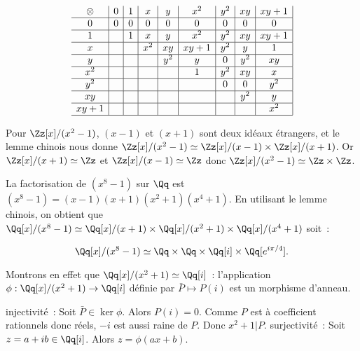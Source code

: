 {\begin{enumerate}
{$$
\begin{array}{c|c|c|c|c|c|c|c|c|c|c|}
\otimes   &   0 &   1 &   x &   y & x^2  & y^2  & xy   & xy+1\\\hline
0         &   0 &   0 &   0 &   0 & 0    & 0    & 0    & 0   \\\hline
1         &     &   1 &   x &   y & x^2  & y^2  & xy   & xy+1\\\hline
x         &     &     & x^2 &  xy & xy+1 & y^2  & y    & 1   \\\hline
y         &     &     &     & y^2 &  y   & 0    & y^2  & xy  \\\hline
x^2       &     &     &     &     &  1   & y^2  & xy   & x   \\\hline
y^2       &     &     &     &     &      & 0    & 0    & y^2 \\\hline
xy        &     &     &     &     &      &      & y^2  & y   \\\hline
xy+1      &     &     &     &     &      &      &      & x^2 \\\hline
\end{array}
$$
 
Pour $\Zz[x]/(x^{2}-1)$, $(x-1)$ et $(x+1)$ sont deux idéaux étrangers,
et le lemme chinois nous donne $\Zz[x]/(x^{2}-1)\simeq
\Zz[x]/(x-1)\times\Zz[x]/(x+1)$. Or $\Zz[x]/(x+1)\simeq\Zz$ et
$\Zz[x]/(x-1)\simeq\Zz$ donc $\Zz[x]/(x^{2}-1)\simeq\Zz\times\Zz$.


La factorisation de $(x^{8}-1)$ sur $\Qq$ est
$(x^{8}-1)=(x-1)(x+1)(x^{2}+1)(x^{4}+1)$. En utilisant le lemme chinois,
on obtient que $\Qq[x]/(x^{8}-1)\simeq \Qq[x]/(x+1)\times
\Qq[x]/(x^{2}+1)\times \Qq[x]/(x^{4}+1)$ soit~:

$$
\Qq[x]/(x^{8}-1)\simeq
\Qq\times\Qq\times\Qq[i]\times\Qq[e^{i\pi/4}].
$$

Montrons en effet que $\Qq[x]/(x^{2}+1)\simeq\Qq[i]$~: l'application
$\phi:\Qq[x]/(x^{2}+1)\to \Qq[i]$ définie par $\bar P\mapsto P(i)$ est un
morphisme d'anneau.
\begin{itemize}
injectivité~:
  Soit $\bar{P}\in\ker\phi$. Alors $P(i)=0$. Comme $P$ est à coefficient
  rationnels donc réels, $-i$ est aussi raine de $P$. Donc $x^{2}+1|P$.
surjectivité~:
  Soit $z=a+ib\in\Qq[i]$. Alors $z=\phi(ax+b)$.
\end{itemize}

\smallskip

}
\end{enumerate}}
